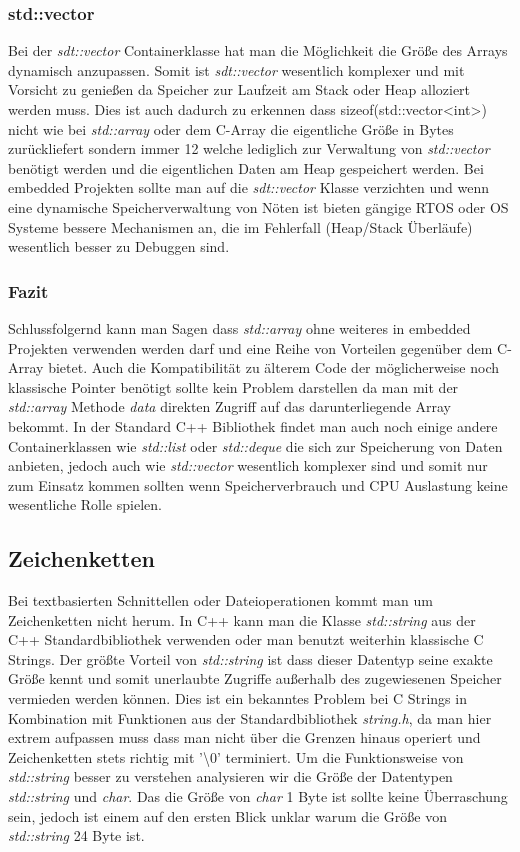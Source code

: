 \documentclass[MES,Master,ngerman]{twbook}%
\begin{document}
\subsubsection{std::vector}
Bei der \textit{sdt::vector} Containerklasse hat man die Möglichkeit die Größe des Arrays dynamisch anzupassen. Somit ist \textit{sdt::vector} wesentlich komplexer und mit Vorsicht zu genießen da Speicher zur Laufzeit am Stack oder Heap alloziert werden muss. Dies ist auch dadurch zu erkennen dass sizeof(std::vector<int>) nicht wie bei \textit{std::array} oder dem C-Array die eigentliche Größe in Bytes zurückliefert sondern immer 12 welche lediglich zur Verwaltung von \textit{std::vector} benötigt werden und die eigentlichen Daten am Heap gespeichert werden. Bei embedded Projekten sollte man auf die \textit{sdt::vector} Klasse verzichten und wenn eine dynamische Speicherverwaltung von Nöten ist bieten gängige RTOS oder OS Systeme bessere Mechanismen an, die im Fehlerfall (Heap/Stack Überläufe) wesentlich besser zu Debuggen sind.

\subsubsection{Fazit}
Schlussfolgernd kann man Sagen dass \textit{std::array} ohne weiteres in embedded Projekten verwenden werden darf und eine Reihe von Vorteilen gegenüber dem C-Array bietet. Auch die Kompatibilität zu älterem Code der möglicherweise noch klassische Pointer benötigt sollte kein Problem darstellen da man mit der \textit{std::array} Methode \textit{data} direkten Zugriff auf das darunterliegende Array bekommt. In der Standard C++ Bibliothek findet man auch noch einige andere Containerklassen wie \textit{std::list} oder \textit{std::deque} die sich zur Speicherung von Daten anbieten, jedoch auch wie \textit{std::vector} wesentlich komplexer sind und somit nur zum Einsatz kommen sollten wenn Speicherverbrauch und CPU Auslastung keine wesentliche Rolle spielen.
\newpage

\subsection{Zeichenketten}
Bei textbasierten Schnittellen oder Dateioperationen kommt man um Zeichenketten nicht herum. In C++ kann man die Klasse \textit{std::string} aus der C++ Standardbibliothek verwenden oder man benutzt weiterhin klassische C Strings. Der größte Vorteil von \textit{std::string} ist dass dieser Datentyp seine exakte Größe kennt und somit unerlaubte Zugriffe außerhalb des zugewiesenen Speicher vermieden werden können. Dies ist ein bekanntes Problem bei C Strings in Kombination mit Funktionen aus der Standardbibliothek \textit{string.h}, da man hier extrem aufpassen muss dass man nicht über die Grenzen hinaus operiert und Zeichenketten stets richtig mit '\textbackslash 0' terminiert. \newline\newline
Um die Funktionsweise von \textit{std::string} besser zu verstehen analysieren wir die Größe der Datentypen \textit{std::string} und \textit{char}. Das die Größe von \textit{char} 1 Byte ist sollte keine Überraschung sein, jedoch ist einem auf den ersten Blick unklar warum die Größe von \textit{std::string} 24 Byte ist.
\end{document}
